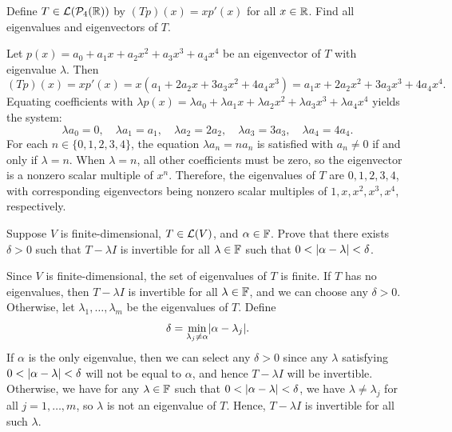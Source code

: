 \begin{exc}
\begin{exercise}
Define $T\in\mathcal{L}(\mathcal{P}_4(\mathbb{R}))$ by $(Tp)(x)=xp'(x)$ for all $x\in\mathbb{R}$. Find all
eigenvalues and eigenvectors of $T$.
\end{exercise}
\begin{solution}
Let $p(x)=a_0+a_1x+a_2x^2+a_3x^3+a_4x^4$ be an eigenvector of $T$ with
eigenvalue $\lambda$. Then
\[ (Tp)(x) = xp'(x) = x(a_1+2a_2x+3a_3x^2+4a_4x^3)
   = a_1x+2a_2x^2+3a_3x^3+4a_4x^4. \]
Equating coefficients with
$\lambda p(x)=\lambda a_0+\lambda a_1x+\lambda a_2x^2+\lambda a_3x^3
+\lambda a_4x^4$ yields the system:
\[ \lambda a_0=0,\quad \lambda a_1=a_1,\quad \lambda a_2=2a_2,\quad
   \lambda a_3=3a_3,\quad \lambda a_4=4a_4. \]
For each $n\in\{0,1,2,3,4\}$, the equation $\lambda a_n=na_n$ is satisfied
with $a_n\ne0$ if and only if $\lambda=n$. When $\lambda=n$, all other
coefficients must be zero, so the eigenvector is a nonzero scalar multiple of
$x^n$. Therefore, the eigenvalues of $T$ are $0,1,2,3,4$, with corresponding
eigenvectors being nonzero scalar multiples of $1,x,x^2,x^3,x^4$,
respectively.
\end{solution}

\begin{exercise}
Suppose $V$ is finite-dimensional, $T\in\mathcal{L}(V)$, and $\alpha\in\mathbb{F}$. Prove that
there exists $\delta>0$ such that $T-\lambda I$ is invertible for all
$\lambda\in\mathbb{F}$ such that $0<\lvert \alpha-\lambda \rvert<\delta$.
\end{exercise}
\begin{solution}
Since $V$ is finite-dimensional, the set of eigenvalues of $T$ is finite. If
$T$ has no eigenvalues, then $T-\lambda I$ is invertible for all
$\lambda\in\mathbb{F}$, and we can choose any $\delta>0$. Otherwise, let
$\lambda_1,\dots,\lambda_m$ be the eigenvalues of $T$. Define
\[ \delta = \min_{\lambda_j\ne\alpha}\lvert \alpha-\lambda_j \rvert. \]
If $\alpha$ is the only eigenvalue, then we can select any $\delta>0$ since any
$\lambda$ satisfying $0<\lvert \alpha-\lambda \rvert<\delta$ will not be equal to
$\alpha$, and hence $T-\lambda I$ will be invertible. Otherwise, we have for
any $\lambda\in\mathbb{F}$ such that $0<\lvert \alpha-\lambda \rvert<\delta$, we have
$\lambda\ne\lambda_j$ for all $j=1,\dots,m$, so $\lambda$ is not an eigenvalue
of $T$. Hence, $T-\lambda I$ is invertible for all such $\lambda$.
\end{solution}


\end{exc}
